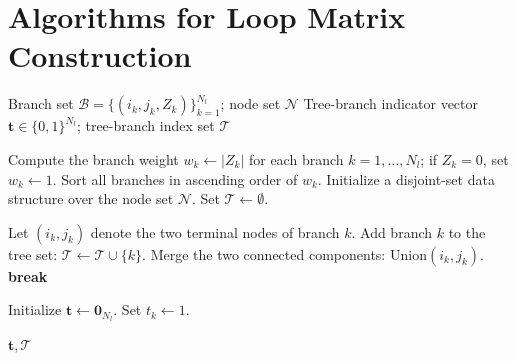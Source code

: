 \documentclass[journal]{IEEEtran}
\begin{document}
\appendices
\section{Algorithms for Loop Matrix Construction}

\begin{algorithm}[!htbp]
\caption{Tree-Branch Identification via Weighted Spanning Tree}
\label{alg:mst}
\begin{algorithmic}[1]
\REQUIRE Branch set $\mathcal{B}=\{(i_k,j_k,Z_k)\}_{k=1}^{N_l}$; node set $\mathcal{N}$
\ENSURE Tree-branch indicator vector $\mathbf{t}\in\{0,1\}^{N_l}$; tree-branch index set $\mathcal{T}$

\STATE Compute the branch weight $w_k \leftarrow |Z_k|$ for each branch $k=1,\ldots,N_l$; if $Z_k=0$, set $w_k \leftarrow 1$.
\STATE Sort all branches in ascending order of $w_k$.
\STATE Initialize a disjoint-set data structure over the node set $\mathcal{N}$.
\STATE Set $\mathcal{T}\leftarrow \emptyset$.

    \STATE Let $(i_k,j_k)$ denote the two terminal nodes of branch $k$.
        \STATE Add branch $k$ to the tree set: $\mathcal{T}\leftarrow \mathcal{T}\cup\{k\}$.
        \STATE Merge the two connected components: $\mathrm{Union}(i_k,j_k)$.
            \STATE \textbf{break}
        \ENDIF
    \ENDIF
\ENDFOR

\STATE Initialize $\mathbf{t}\leftarrow \mathbf{0}_{N_l}$.
    \STATE Set $t_k\leftarrow 1$.
\ENDFOR

\RETURN $\mathbf{t},\mathcal{T}$
\end{algorithmic}
\end{algorithm}

\end{document}
